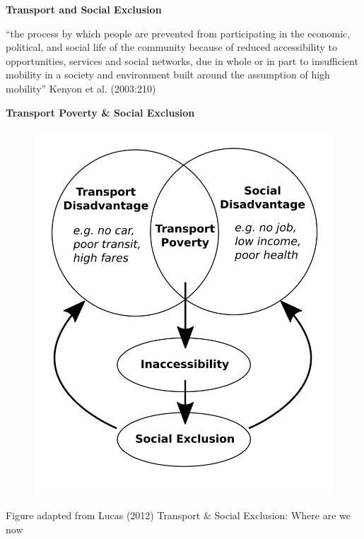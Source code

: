 \documentclass[aspectratio=169]{beamer}
\begin{document}
\begin{frame}
	
	\textbf{Transport and Social Exclusion}
	
	“the process by which people are prevented from
	participating in the economic, political, and social
	life of the community because of reduced
	accessibility to opportunities, services and social
	networks, due in whole or in part to insufficient
	mobility in a society and environment built around
	the assumption of high mobility” Kenyon et al. (2003:210)
	
\end{frame}






\begin{frame}
	
	\textbf{Transport Poverty \& Social Exclusion}
	
	\begin{figure}
		\centering
		\includegraphics[width=0.44\linewidth]{images/tpov.png}
	\end{figure}
	
	\tiny Figure adapted from Lucas (2012) Transport \& Social Exclusion: Where are we now
	
\end{frame}
\end{document}

